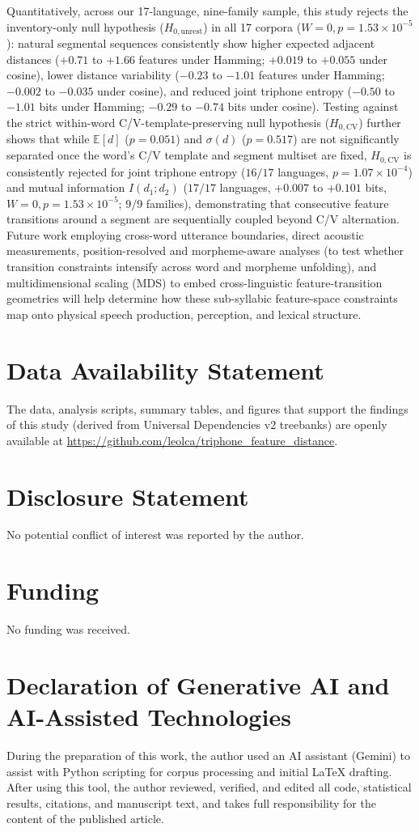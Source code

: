 \documentclass{interact}
\begin{document}
Quantitatively, across our 17-language, nine-family sample, this study rejects the inventory-only null hypothesis ($H_{0,\text{unrest}}$) in all 17 corpora ($W=0, p=1.53 \times 10^{-5}$): natural segmental sequences consistently show higher expected adjacent distances ($+0.71$ to $+1.66$ features under Hamming; $+0.019$ to $+0.055$ under cosine), lower distance variability ($-0.23$ to $-1.01$ features under Hamming; $-0.002$ to $-0.035$ under cosine), and reduced joint triphone entropy ($-0.50$ to $-1.01$ bits under Hamming; $-0.29$ to $-0.74$ bits under cosine). Testing against the strict within-word C/V-template-preserving null hypothesis ($H_{0,\text{CV}}$) further shows that while $\mathbb{E}[d]$ ($p=0.051$) and $\sigma(d)$ ($p=0.517$) are not significantly separated once the word's C/V template and segment multiset are fixed, $H_{0,\text{CV}}$ is consistently rejected for joint triphone entropy ($16/17$ languages, $p=1.07 \times 10^{-4}$) and mutual information $I(d_1; d_2)$ ($17/17$ languages, $+0.007$ to $+0.101$ bits, $W=0, p=1.53 \times 10^{-5}$; $9/9$ families), demonstrating that consecutive feature transitions around a segment are sequentially coupled beyond C/V alternation. Future work employing cross-word utterance boundaries, direct acoustic measurements, position-resolved and morpheme-aware analyses (to test whether transition constraints intensify across word and morpheme unfolding), and multidimensional scaling (MDS) to embed cross-linguistic feature-transition geometries will help determine how these sub-syllabic feature-space constraints map onto physical speech production, perception, and lexical structure.

\section*{Data Availability Statement}
The data, analysis scripts, summary tables, and figures that support the findings of this study (derived from Universal Dependencies v2 treebanks) are openly available at \url{https://github.com/leolca/triphone_feature_distance}.

\section*{Disclosure Statement}
No potential conflict of interest was reported by the author.

\section*{Funding}
No funding was received.

\section*{Declaration of Generative AI and AI-Assisted Technologies}
During the preparation of this work, the author used an AI assistant (Gemini) to assist with Python scripting for corpus processing and initial LaTeX drafting. After using this tool, the author reviewed, verified, and edited all code, statistical results, citations, and manuscript text, and takes full responsibility for the content of the published article.



\end{document}
